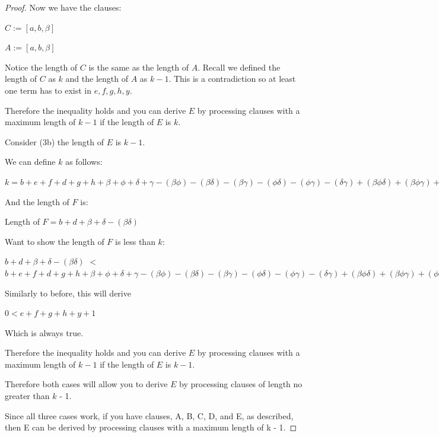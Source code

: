 \documentclass[manuscript]{acmart}
\begin{document}
\begin{proof}
        Now we have the clauses:

        $C := [a, b, \beta]$

        $A := [a, b, \beta]$

        Notice the length of $C$ is the same as the length of $A$. Recall we defined the length of $C$ as $k$ and the length of $A$ as $k-1$. This is a contradiction so at least one term has to exist in {$e, f, g, h, y$}.

        Therefore the inequality holds and you can derive $E$ by processing clauses with a maximum length of $k-1$ if the length of $E$ is $k$.

        Consider (3b) the length of $E$ is $k - 1$.

        We can define $k$ as follows:

        $k = b + e + f + d + g + h 
            + \beta + \phi + \delta + \gamma
            - (\beta \phi) - (\beta \delta) - (\beta \gamma) - (\phi \delta) - (\phi \gamma) - (\delta \gamma)
            + (\beta \phi \delta) + (\beta \phi \gamma) + (\phi \delta \gamma)
            - (\beta \phi \delta \gamma)
            $

        And the length of $F$ is:

        Length of $F = b + d + \beta + \delta - (\beta \delta)$

        Want to show the length of $F$ is less than $k$:

        $b + d + \beta + \delta - (\beta \delta)$
        $<$
        $b + e + f + d + g + h 
            + \beta + \phi + \delta + \gamma
            - (\beta \phi) - (\beta \delta) - (\beta \gamma) - (\phi \delta) - (\phi \gamma) - (\delta \gamma)
            + (\beta \phi \delta) + (\beta \phi \gamma) + (\phi \delta \gamma)
            - (\beta \phi \delta \gamma)
        $

        Similarly to before, this will derive

        $0 < e + f + g + h + y + 1$

        Which is always true.

        Therefore the inequality holds and you can derive $E$ by processing clauses with a maximum length of $k-1$ if the length of $E$ is $k - 1$.

        Therefore both cases will allow you to derive $E$ by processing clauses of length no greater than $k$ - 1.        

        Since all three cases work, if you have clauses, A, B, C, D, and E, as described,
        then E can be derived by processing clauses with a maximum length
        of k - 1.
    \end{proof}
\end{document}
